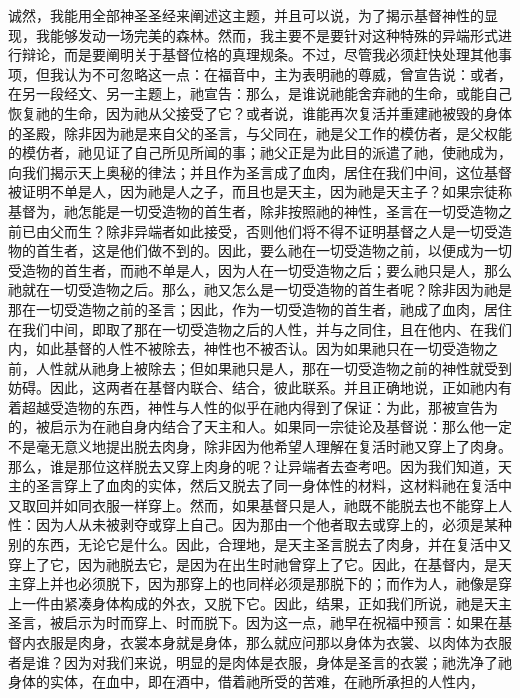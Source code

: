 诚然，我能用全部神圣圣经来阐述这主题，并且可以说，为了揭示基督神性的显现，我能够发动一场完美的森林。然而，我主要不是要针对这种特殊的异端形式进行辩论，而是要阐明关于基督位格的真理规条。不过，尽管我必须赶快处理其他事项，但我认为不可忽略这一点：在福音中，主为表明祂的尊威，曾宣告说：或者，在另一段经文、另一主题上，祂宣告：那么，是谁说祂能舍弃祂的生命，或能自己恢复祂的生命，因为祂从父接受了它？或者说，谁能再次复活并重建祂被毁的身体的圣殿，除非因为祂是来自父的圣言，与父同在，祂是父工作的模仿者，是父权能的模仿者，祂见证了自己所见所闻的事；祂父正是为此目的派遣了祂，使祂成为，向我们揭示天上奥秘的律法；并且作为圣言成了血肉，居住在我们中间，这位基督被证明不单是人，因为祂是人之子，而且也是天主，因为祂是天主子？如果宗徒称基督为，祂怎能是一切受造物的首生者，除非按照祂的神性，圣言在一切受造物之前已由父而生？除非异端者如此接受，否则他们将不得不证明基督之人是一切受造物的首生者，这是他们做不到的。因此，要么祂在一切受造物之前，以便成为一切受造物的首生者，而祂不单是人，因为人在一切受造物之后；要么祂只是人，那么祂就在一切受造物之后。那么，祂又怎么是一切受造物的首生者呢？除非因为祂是那在一切受造物之前的圣言；因此，作为一切受造物的首生者，祂成了血肉，居住在我们中间，即取了那在一切受造物之后的人性，并与之同住，且在他内、在我们内，如此基督的人性不被除去，神性也不被否认。因为如果祂只在一切受造物之前，人性就从祂身上被除去；但如果祂只是人，那在一切受造物之前的神性就受到妨碍。因此，这两者在基督内联合、结合，彼此联系。并且正确地说，正如祂内有着超越受造物的东西，神性与人性的似乎在祂内得到了保证：为此，那被宣告为的，被启示为在祂自身内结合了天主和人。如果同一宗徒论及基督说：那么他一定不是毫无意义地提出脱去肉身，除非因为他希望人理解在复活时祂又穿上了肉身。那么，谁是那位这样脱去又穿上肉身的呢？让异端者去查考吧。因为我们知道，天主的圣言穿上了血肉的实体，然后又脱去了同一身体性的材料，这材料祂在复活中又取回并如同衣服一样穿上。然而，如果基督只是人，祂既不能脱去也不能穿上人性：因为人从未被剥夺或穿上自己。因为那由一个他者取去或穿上的，必须是某种别的东西，无论它是什么。因此，合理地，是天主圣言脱去了肉身，并在复活中又穿上了它，因为祂脱去它，是因为在出生时祂曾穿上了它。因此，在基督内，是天主穿上并也必须脱下，因为那穿上的也同样必须是那脱下的；而作为人，祂像是穿上一件由紧凑身体构成的外衣，又脱下它。因此，结果，正如我们所说，祂是天主圣言，被启示为时而穿上、时而脱下。因为这一点，祂早在祝福中预言：如果在基督内衣服是肉身，衣裳本身就是身体，那么就应问那以身体为衣裳、以肉体为衣服者是谁？因为对我们来说，明显的是肉体是衣服，身体是圣言的衣裳；祂洗净了祂身体的实体，在血中，即在酒中，借着祂所受的苦难，在祂所承担的人性内，